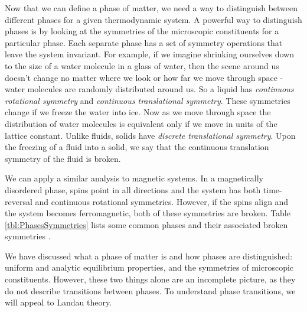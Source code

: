 Now that we can define a phase of matter, we need a way to distinguish between different phases for a given thermodynamic system. A powerful way to distinguish phases is by looking at the symmetries of the microscopic constituents for a particular phase. Each separate phase has a set of symmetry operations that leave the system invariant. For example, if we imagine shrinking ourselves down to the size of a water molecule in a glass of water, then the scene around us doesn't change no matter where we look or how far we move through space - water molecules are randomly distributed around us. So a liquid has \textit{continuous rotational symmetry} and \textit{continuous translational symmetry}. These symmetries change if we freeze the water into ice. Now as we move through space the distribution of water molecules is equivalent only if we move in units of the lattice constant. Unlike fluids, solids have \textit{discrete translational symmetry}. Upon the freezing of a fluid into a solid, we say that the continuous translation symmetry of the fluid is broken. 

We can apply a similar analysis to magnetic systems. In a magnetically disordered phase, spins point in all directions and the system has both time-reversal and continuous rotational symmetries. However, if the spins align and the system becomes ferromagnetic, both of these symmetries are broken. Table \ref{tbl:PhasesSymmetries} lists some common phases and their associated broken symmetries \cite{Chaikin1995}.

\begin{center}
	\label{tbl:PhasesSymmetries}
\end{center}

We have discussed what a phase of matter is and how phases are distinguished: uniform and analytic equilibrium properties, and the symmetries of microscopic constituents. However, these two things alone are an incomplete picture, as they do not describe transitions between phases. To understand phase transitions, we will appeal to Landau theory.

